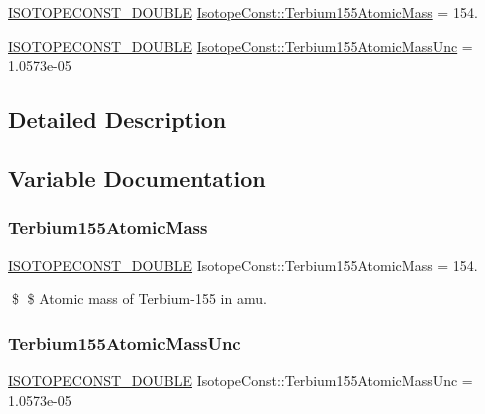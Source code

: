 \begin{DoxyCompactItemize}
\item 
\mbox{\hyperlink{group___isotope_const-_macros_ga8f45a7272ce02c0b4c65c44636ed719a}{I\+S\+O\+T\+O\+P\+E\+C\+O\+N\+S\+T\+\_\+\+D\+O\+U\+B\+LE}} \mbox{\hyperlink{group___isotope_const-_terbium-_tb155_gaeadcc7da25e76166bf5efdfc26bb8929}{Isotope\+Const\+::\+Terbium155\+Atomic\+Mass}} = 154.
\item 
\mbox{\hyperlink{group___isotope_const-_macros_ga8f45a7272ce02c0b4c65c44636ed719a}{I\+S\+O\+T\+O\+P\+E\+C\+O\+N\+S\+T\+\_\+\+D\+O\+U\+B\+LE}} \mbox{\hyperlink{group___isotope_const-_terbium-_tb155_gacc0131a622fb32a4dd435b08961719b3}{Isotope\+Const\+::\+Terbium155\+Atomic\+Mass\+Unc}} = 1.\+0573e-\/05
\end{DoxyCompactItemize}


\subsection{Detailed Description}


\subsection{Variable Documentation}
\mbox{\label{group___isotope_const-_terbium-_tb155_gaeadcc7da25e76166bf5efdfc26bb8929}} 
\subsubsection{\texorpdfstring{Terbium155\+Atomic\+Mass}{Terbium155AtomicMass}}
{\footnotesize\ttfamily \mbox{\hyperlink{group___isotope_const-_macros_ga8f45a7272ce02c0b4c65c44636ed719a}{I\+S\+O\+T\+O\+P\+E\+C\+O\+N\+S\+T\+\_\+\+D\+O\+U\+B\+LE}} Isotope\+Const\+::\+Terbium155\+Atomic\+Mass = 154.}

\$ \$ Atomic mass of Terbium-\/155 in amu. \mbox{\label{group___isotope_const-_terbium-_tb155_gacc0131a622fb32a4dd435b08961719b3}} 
\subsubsection{\texorpdfstring{Terbium155\+Atomic\+Mass\+Unc}{Terbium155AtomicMassUnc}}
{\footnotesize\ttfamily \mbox{\hyperlink{group___isotope_const-_macros_ga8f45a7272ce02c0b4c65c44636ed719a}{I\+S\+O\+T\+O\+P\+E\+C\+O\+N\+S\+T\+\_\+\+D\+O\+U\+B\+LE}} Isotope\+Const\+::\+Terbium155\+Atomic\+Mass\+Unc = 1.\+0573e-\/05}

